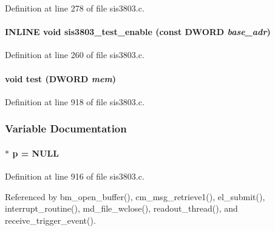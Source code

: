 Definition at line 278 of file sis3803.c.
\paragraph[{sis3803\_\-test\_\-enable}]{\setlength{\rightskip}{0pt plus 5cm}INLINE void sis3803\_\-test\_\-enable (const {\bf DWORD} {\em base\_\-adr})}\hfill\label{sis3803_8c_a858a2be0cfac76220706002990e82b85}


Definition at line 260 of file sis3803.c.
\paragraph[{test}]{\setlength{\rightskip}{0pt plus 5cm}void test ({\bf DWORD} {\em mem})}\hfill\label{sis3803_8c_a8fa8e4c8bef10b038f6a033f736d5bce}


Definition at line 918 of file sis3803.c.

\subsubsection{Variable Documentation}
\paragraph[{p}]{$\ast$ {\bf p} = NULL}\hfill\label{sis3803_8c_afcb0609a0beab248bb3994a3368bd9ff}


Definition at line 916 of file sis3803.c.

Referenced by bm\_\-open\_\-buffer(), cm\_\-msg\_\-retrieve1(), el\_\-submit(), interrupt\_\-routine(), md\_\-file\_\-wclose(), readout\_\-thread(), and receive\_\-trigger\_\-event().